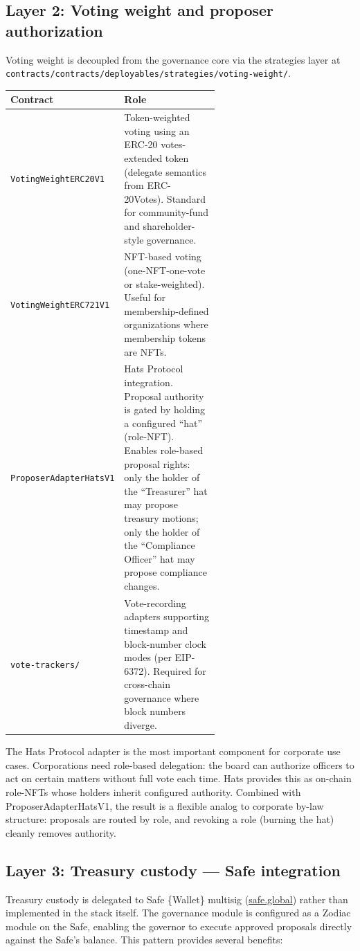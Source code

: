 \documentclass[11pt,letterpaper]{article}
\begin{document}
\subsection{Layer 2: Voting weight and proposer authorization}

Voting weight is decoupled from the governance core via the strategies layer at \texttt{contracts/contracts/deployables/strategies/voting-weight/}.

\begin{longtable}{lp{0.6\linewidth}}
\toprule
\textbf{Contract} & \textbf{Role} \\
\midrule
\texttt{VotingWeightERC20V1} & Token-weighted voting using an ERC-20 votes-extended token (delegate semantics from ERC-20Votes). Standard for community-fund and shareholder-style governance. \\
\texttt{VotingWeightERC721V1} & NFT-based voting (one-NFT-one-vote or stake-weighted). Useful for membership-defined organizations where membership tokens are NFTs. \\
\texttt{ProposerAdapterHatsV1} & Hats Protocol integration. Proposal authority is gated by holding a configured ``hat'' (role-NFT). Enables role-based proposal rights: only the holder of the ``Treasurer'' hat may propose treasury motions; only the holder of the ``Compliance Officer'' hat may propose compliance changes. \\
\texttt{vote-trackers/} & Vote-recording adapters supporting timestamp and block-number clock modes (per EIP-6372). Required for cross-chain governance where block numbers diverge. \\
\bottomrule
\end{longtable}

The Hats Protocol adapter is the most important component for corporate use cases. Corporations need role-based delegation: the board can authorize officers to act on certain matters without full vote each time. Hats provides this as on-chain role-NFTs whose holders inherit configured authority. Combined with ProposerAdapterHatsV1, the result is a flexible analog to corporate by-law structure: proposals are routed by role, and revoking a role (burning the hat) cleanly removes authority.

\subsection{Layer 3: Treasury custody --- Safe integration}

Treasury custody is delegated to Safe \{Wallet\} multisig (\href{https://safe.global}{safe.global}) rather than implemented in the stack itself. The governance module is configured as a Zodiac module on the Safe, enabling the governor to execute approved proposals directly against the Safe's balance. This pattern provides several benefits:
\end{document}
